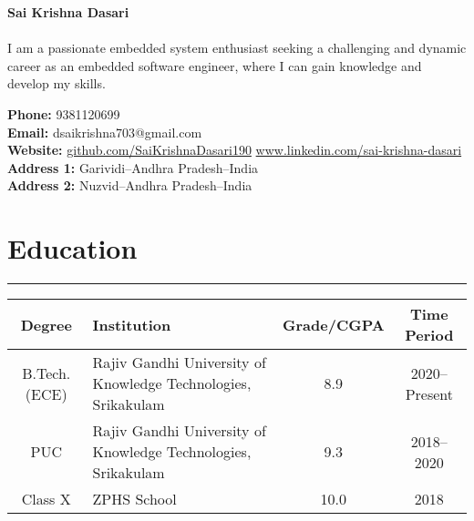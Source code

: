 \documentclass[10pt]{article}
\renewcommand{\arraystretch}{1.5}
\begin{document}
\begin{multicols}{2}
{\LARGE \textbf{Sai Krishna Dasari\\\\}}
I am a passionate embedded system enthusiast seeking a challenging and dynamic career as an embedded software engineer, where I can gain knowledge and develop my skills.

\columnbreak
\begin{flushright}
\textbf{Phone:} 9381120699\\
\textbf{Email:} dsaikrishna703@gmail.com \\
 \textbf{Website: }\href{https://github.com/SaiKrishnaDasari190}{github.com/SaiKrishnaDasari190}
 \href{https://www.linkedin.com/in/sai-krishna-dasari-694381191/}{www.linkedin.com/sai-krishna-dasari}\\
 \textbf{Address 1: }Garividi–Andhra Pradesh–India\\
\textbf{Address 2: }Nuzvid–Andhra Pradesh–India
\end{flushright}
\end{multicols}

\section*{Education}
\hrule
\begin{table}[h]
  \setlength{\tabcolsep}{5pt} %
  \renewcommand{\arraystretch}{1.5} %
  \begin{tabularx}{\textwidth}{|c|X|c|c|}
    \hline
    \textbf{Degree} &\centering\textbf{ Institution}&\textbf{Grade/CGPA}&\textbf{Time Period}\\
    \hline
    B.Tech. (ECE) & Rajiv Gandhi University of Knowledge \centering Technologies, Srikakulam & 8.9 & 2020--Present \\
    \hline
    PUC & Rajiv Gandhi University of Knowledge \centering Technologies, Srikakulam & 9.3 & 2018--2020 \\
    \hline
    Class X &\centering ZPHS School & 10.0 & 2018 \\
    \hline
  \end{tabularx}
\end{table}

\end{document}
